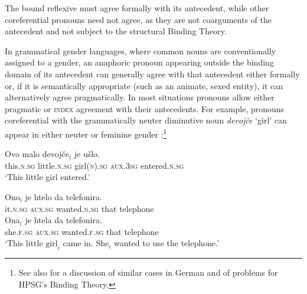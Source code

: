 \documentclass[output=paper
 	        ,biblatex
                ,babelshorthands
                ,newtxmath
                ,draftmode
                ,colorlinks, citecolor=brown
]{langscibook}
\begin{document}
\begin{exe}
\ex   \label{lurch}
\begin{xlist}
\end{xlist}
\end{exe}

\noindent
The bound reflexive must agree formally with its antecedent, while other
coreferential pronouns need not agree, as they are not coarguments of the antecedent and not subject to the structural Binding Theory.  

In grammatical gender languages, where common nouns are conventionally assigned to a gender, an anaphoric pronoun appearing outside the binding domain of its antecedent can generally agree with that antecedent either formally or, if it is semantically appropriate (such as an animate, sexed entity), it can alternatively agree pragmatically.  In most situations pronouns allow either pragmatic or \textsc{index} agreement with their
antecedents.  For example, pronouns coreferential with the  grammatically neuter diminutive noun \textit{devojče} `girl' can appear in either neuter or feminine gender \citep[from][198]{Wechsler+Zlatic:2003}:\footnote{
See also  for a discussion of similar cases in German and of problems for HPSG's Binding Theory.
}

\begin{exe}
\ex \label{girl}
\gll Ovo	        malo                 devojče$_i$                  je               ušlo.  \\
     this.\textsc{n.sg} little.\textsc{n.sg} girl(\textsc{n}).\textsc{sg} \textsc{aux.3sg} entered.\textsc{n.sg}  \\
\glt `This little girl entered.'
\begin{xlist}
\ex  
\gll Ono$_i$	      je	      htelo	           da	telefonira. \\
     it.\textsc{n.sg} \textsc{aux.sg} wanted.\textsc{n.sg} that	telephone   \\
\ex  
\gll Ona$_i$	je	htela	da	telefonira. \\
     she.\textsc{f.sg}  	\textsc{aux.sg}  	wanted.\textsc{f.sg}  	that	telephone \\
\glt `This little $\mbox{girl}_i$ came in.  $\mbox{She}_i$ wanted to use the telephone.'
\end{xlist}
\end{exe}
\end{document}
